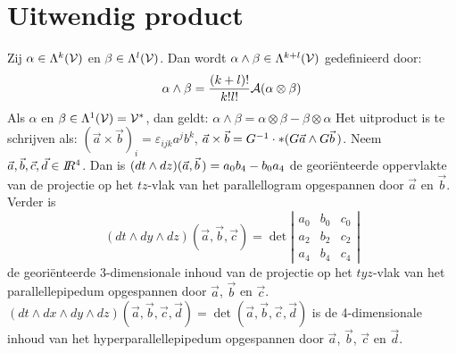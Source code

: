 \section{Uitwendig product}
Zij $\alpha\in\Lambda^k(\cal V)$ en $\beta\in\Lambda^l(\cal V)$. Dan wordt
$\alpha\wedge\beta\in\Lambda^{k+l}(\cal V)$ gedefinieerd door:
\[
\alpha\wedge\beta=\frac{(k+l)!}{k!l!}{\cal A}(\alpha\otimes\beta)
\]
Als $\alpha$ en $\beta\in\Lambda^1(\cal V)={\cal V}^*$, dan geldt:
$\alpha\wedge\beta=\alpha\otimes\beta-\beta\otimes\alpha$
\npar
Het uitproduct is te schrijven als: $(\vec{a}\times\vec{b})_i=\varepsilon_{ijk}a^jb^k$,
$\vec{a}\times\vec{b}=G^{-1}\cdot*(G\vec{a}\wedge G\vec{b}\,)$.
\npar
Neem $\vec{a},\vec{b},\vec{c},\vec{d}\in I\hspace{-1mm}R^4$. Dan is
$(dt\wedge dz)(\vec{a},\vec{b}\,)=a_0b_4-b_0a_4$ de geori\"enteerde oppervlakte
van de projectie op het $tz$-vlak van het parallellogram opgespannen door
$\vec{a}$ en $\vec{b}$.
\npar
Verder is
\[
(dt\wedge dy\wedge dz)(\vec{a},\vec{b},\vec{c})=\det\left|\begin{array}{ccc}
a_0&b_0&c_0\\ a_2&b_2&c_2\\ a_4&b_4&c_4 \end{array}\right|
\]
de geori\"enteerde 3-dimensionale inhoud van de projectie op het $tyz$-vlak
van het parallellepipedum opgespannen door $\vec{a}$, $\vec{b}$ en $\vec{c}$.
\npar
$(dt\wedge dx\wedge dy\wedge dz)(\vec{a},\vec{b},\vec{c},\vec{d})=\det(\vec{a},\vec{b},\vec{c},\vec{d})$
is de 4-dimensionale inhoud van het hyperparallellepipedum opgespannen door
$\vec{a}$, $\vec{b}$, $\vec{c}$ en $\vec{d}$.

